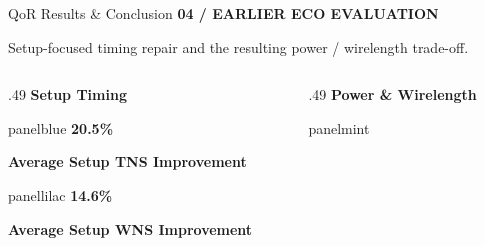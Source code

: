 \documentclass[aspectratio=169,10pt]{beamer}
\newcommand{\smalllabel}[1]{{\scriptsize\bfseries\color{Accent}\MakeUppercase{#1}}}
\newcommand{\slidenavigation}{}
\newcommand{\slideposition}{}
\newcommand{\slidesubtitle}[1]{%
  \smalllabel{#1}%
}
\begin{document}
\renewcommand{\slidenavigation}{\hyperlink{details-index}{\beamerbutton{Details index}}\hspace{.12cm}\hyperlink{detail-quality}{\beamerbutton{QoR scoring}}}
\renewcommand{\slideposition}{Summary 9 / 18}
\begin{frame}[label=summary-9]{QoR Results \& Conclusion}
  \vspace{.01cm}\slidesubtitle{04 / Earlier ECO Evaluation}\par\vspace{.11cm}
  {\small\color{Muted}Setup-focused timing repair and the resulting power / wirelength trade-off.}\par
  \vspace{.08cm}
  \begin{columns}[T,onlytextwidth]
    \begin{column}{.49\textwidth}
      {\small\bfseries\color{Accent}Setup Timing}\par\vspace{.10cm}
      \begin{beamercolorbox}[rounded=true,sep=.14cm,wd=\linewidth]{panelblue}
        {\fontsize{24}{27}\selectfont\bfseries\color{AccentBlue}20.5\%}\par\vspace{.025cm}
        {\small\bfseries Average Setup TNS Improvement}\par
      \end{beamercolorbox}
      \vspace{.10cm}
      \begin{beamercolorbox}[rounded=true,sep=.14cm,wd=\linewidth]{panellilac}
        {\fontsize{24}{27}\selectfont\bfseries\color{AccentBlue}14.6\%}\par\vspace{.025cm}
        {\small\bfseries Average Setup WNS Improvement}\par
      \end{beamercolorbox}
    \end{column}
    \begin{column}{.49\textwidth}
      {\small\bfseries\color{Accent}Power \& Wirelength}\par\vspace{.10cm}
      \begin{beamercolorbox}[rounded=true,sep=.14cm,wd=\linewidth]{panelmint}

\end{beamercolorbox}
\end{column}
\end{columns}
\end{frame}
\end{document}
